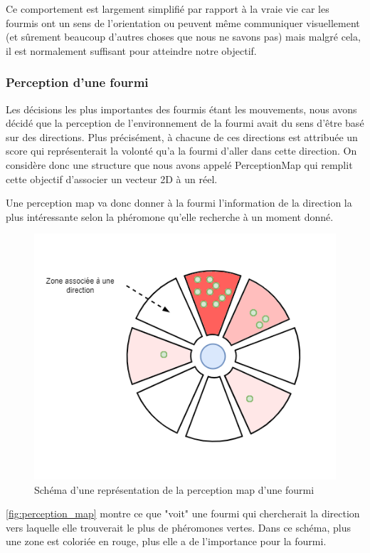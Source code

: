 \documentclass{EPUProjetDi}
\begin{document}
Ce comportement est largement simplifié par rapport à la vraie vie car les fourmis ont un sens de l'orientation ou peuvent même communiquer visuellement 
(et sûrement beaucoup d'autres choses que nous ne savons pas) mais malgré cela, il est normalement suffisant pour atteindre notre objectif. 

\subsubsection{Perception d'une fourmi}

Les décisions les plus importantes des fourmis étant les mouvements, nous avons décidé que la perception de l'environnement de la fourmi avait du sens
d'être basé sur des directions.
Plus précisément, à chacune de ces directions est attribuée un score qui représenterait la volonté qu'a la fourmi d'aller dans cette direction.
On considère donc une structure que nous avons appelé PerceptionMap qui remplit cette objectif d'associer un vecteur 2D à un réel.

Une perception map va donc donner à la fourmi l'information de la direction la plus intéressante selon la phéromone qu'elle recherche à un moment donné.

\begin{figure}[h]
    \centering
    \includegraphics[scale=0.5]{perceptionmap.png}
    \caption{Schéma d'une représentation de la perception map d'une fourmi}
    \label{fig:perception_map}
\end{figure}

\autoref{fig:perception_map} montre ce que "voit" une fourmi qui chercherait la direction vers laquelle elle trouverait le plus de phéromones vertes.
Dans ce schéma, plus une zone est coloriée en rouge, plus elle a de l'importance pour la fourmi.
\end{document}
